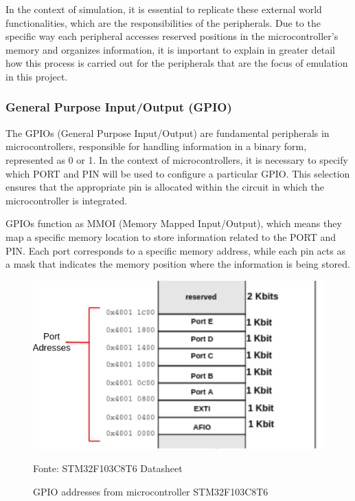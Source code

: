 \documentclass[../monografia.tex]{subfiles}
\begin{document}
In the context of simulation, it is essential to replicate these external world functionalities, which are the responsibilities of the peripherals. Due to the specific way each peripheral accesses reserved positions in the microcontroller's memory and organizes information, it is important to explain in greater detail how this process is carried out for the peripherals that are the focus of emulation in this project.

\subsubsection{General Purpose Input/Output (GPIO)}

The GPIOs (General Purpose Input/Output) are fundamental peripherals in microcontrollers, responsible for handling information in a binary form, represented as 0 or 1. In the context of microcontrollers, it is necessary to specify which PORT and PIN will be used to configure a particular GPIO. This selection ensures that the appropriate pin is allocated within the circuit in which the microcontroller is integrated.

GPIOs function as MMOI (Memory Mapped Input/Output), which means they map a specific memory location to store information related to the PORT and PIN. Each port corresponds to a specific memory address, while each pin acts as a mask that indicates the memory position where the information is being stored.


\begin{figure}[h]
\centering
    \caption{GPIO addresses from microcontroller STM32F103C8T6}
    \centering %
    \includegraphics[width=14cm]{GPIO_addresses.png}
    \par
    Fonte: STM32F103C8T6 Datasheet \cite{STM32F103C8T6_Datasheet_23}
    \label{fig: GPIO addresses from microcontroller STM32F103C8T6}
\end{figure}
\end{document}
